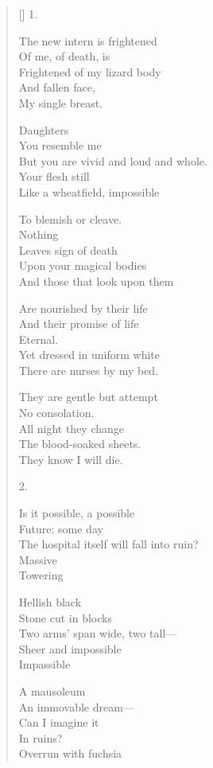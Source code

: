 \settowidth{\versewidth}{The hospital itself will fall into ruin?}
\begin{verse}[\versewidth]
  1.
  
The new intern is frightened\\
Of me, of death, is\\
Frightened of my lizard body\\
And fallen face,\\
My single breast.

Daughters\\
You resemble me\\
But you are vivid and loud and whole.\\
Your flesh still\\
Like a wheatfield, impossible

To blemish or cleave.\\
Nothing\\
Leaves sign of death\\
Upon your magical bodies\\
And those that look upon them

Are nourished by their life\\
And their promise of life\\
Eternal.\\
Yet dressed in uniform white\\
There are nurses by my bed.

They are gentle but attempt\\
No consolation.\\
All night they change\\
The blood-soaked sheets.\\
They know I will die.

2.

Is it possible, a possible\\
Future: some day\\
The hospital itself will fall into ruin?\\
Massive\\
Towering

Hellish black\\
Stone cut in blocks\\
Two arms' span wide, two tall---\\
Sheer and impossible\\
Impassible

A mausoleum\\
An immovable dream---\\
Can I imagine it \\
In ruins?\\
Overrun with fuchsia


\end{verse}
